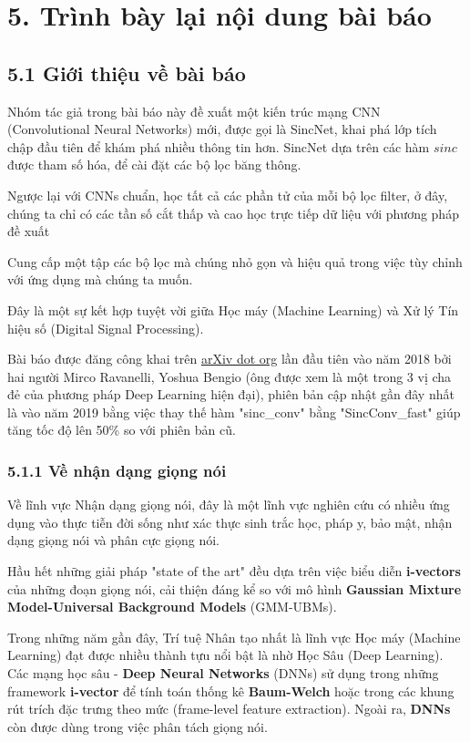 \documentclass{article}
\begin{document}
	\section{5. Trình bày lại nội dung bài báo}
	
	\subsection{5.1 Giới thiệu về bài báo}
	
	\qquad Nhóm tác giả trong bài báo này đề xuất một kiến trúc mạng CNN (Convolutional Neural Networks) mới, được gọi là SincNet, khai phá lớp tích chập đầu tiên để khám phá nhiều thông tin hơn. SincNet dựa trên các hàm $sinc$ được tham số hóa, để cài đặt các bộ lọc băng thông.
	
	Ngược lại với CNNs chuẩn, học tất cả các phần tử của mỗi bộ lọc filter, ở đây, chúng ta chỉ có các tần số cắt thấp và cao học trực tiếp dữ liệu với phương pháp đề xuất
	
	Cung cấp một tập các bộ lọc mà chúng nhỏ gọn và hiệu quả trong việc tùy chỉnh với ứng dụng mà chúng ta muốn.
	
	Đây là một sự kết hợp tuyệt vời giữa Học máy (Machine Learning) và Xử lý Tín hiệu số (Digital Signal Processing).
	
	Bài báo được đăng công khai trên \href{arxiv.org}{arXiv dot org} lần đầu tiên vào năm 2018 bởi hai người Mirco Ravanelli, Yoshua Bengio (ông được xem là một trong 3 vị cha đẻ của phương pháp Deep Learning hiện đại), phiên bản cập nhật gần đây nhất là vào năm 2019 bằng việc thay thế hàm "sinc\_conv" bằng "SincConv\_fast" giúp tăng tốc độ lên 50\% so với phiên bản cũ.
	
	\subsubsection{5.1.1 Về nhận dạng giọng nói}
	\qquad Về lĩnh vực Nhận dạng giọng nói, đây là một lĩnh vực nghiên cứu có nhiều ứng dụng vào thực tiễn đời sống như xác thực sinh trắc học, pháp y, bảo mật, nhận dạng giọng nói và phân cực giọng nói.
	
	Hầu hết những giải pháp "state of the art" đều dựa trên việc biểu diễn \textbf{i-vectors} của những đoạn giọng nói, cải thiện đáng kể so với mô hình \textbf{Gaussian Mixture Model-Universal Background Models} (GMM-UBMs).
	
	Trong những năm gần đây, Trí tuệ Nhân tạo nhất là lĩnh vực Học máy (Machine Learning) đạt được nhiều thành tựu nổi bật là nhờ Học Sâu (Deep Learning). Các mạng học sâu - \textbf{Deep Neural Networks} (DNNs) sử dụng trong những framework \textbf{i-vector} để tính toán thống kê \textbf{Baum-Welch} hoặc trong các khung rút trích đặc trưng theo mức (frame-level feature extraction). Ngoài ra, \textbf{DNNs} còn được dùng trong việc phân tách giọng nói.
	
\end{document}
